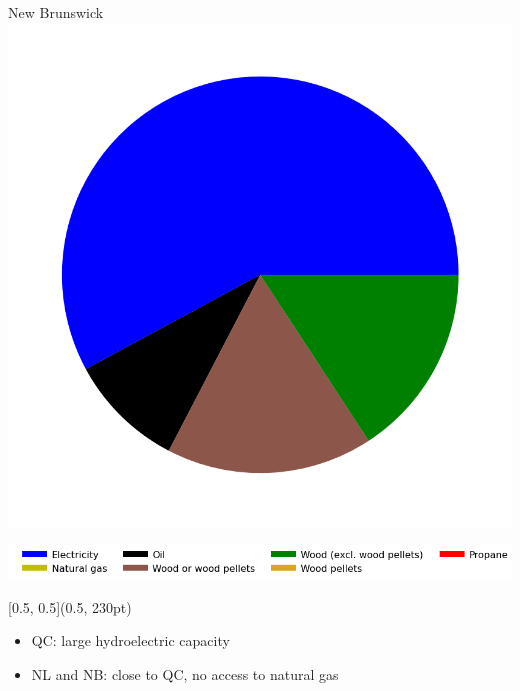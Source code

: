 \documentclass{beamer}
\begin{document}
\begin{frame}
\begin{minipage}[b]{0.33\textwidth}
\begin{center}
\end{center}
\end{minipage}%
%
\begin{minipage}[b]{0.33\textwidth}
\begin{center}
New Brunswick
\includegraphics[width=\linewidth, trim={40pt 70pt 40pt 30pt}, clip]{NB2017.png}%
\end{center}
\end{minipage}



\begin{center}
\includegraphics[width=0.8\linewidth]{leg_bar.png}
\end{center}


\begin{textblock*}{\textwidth}[0.5, 0.5](0.5\linewidth, 230pt)
\begin{itemize}
	\item QC: large hydroelectric capacity
	\item NL and NB: close to QC, no access to natural gas  
\end{itemize}
\end{textblock*}
\end{frame}
\end{document}
